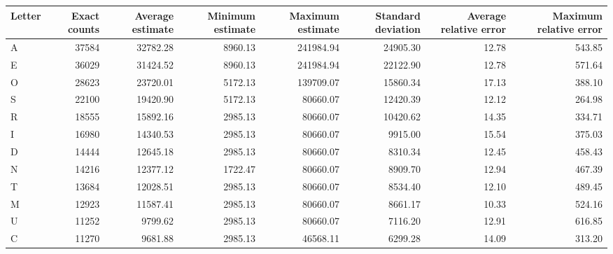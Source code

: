 \begin{tabular}{lrrrrrrr}
\toprule
Letter &  Exact counts &  Average estimate &  Minimum estimate &  Maximum estimate &  Standard deviation &  Average relative error &  Maximum relative error \\
\midrule
     A &         37584 &          32782.28 &           8960.13 &         241984.94 &            24905.30 &                   12.78 &                  543.85 \\
     E &         36029 &          31424.52 &           8960.13 &         241984.94 &            22122.90 &                   12.78 &                  571.64 \\
     O &         28623 &          23720.01 &           5172.13 &         139709.07 &            15860.34 &                   17.13 &                  388.10 \\
     S &         22100 &          19420.90 &           5172.13 &          80660.07 &            12420.39 &                   12.12 &                  264.98 \\
     R &         18555 &          15892.16 &           2985.13 &          80660.07 &            10420.62 &                   14.35 &                  334.71 \\
     I &         16980 &          14340.53 &           2985.13 &          80660.07 &             9915.00 &                   15.54 &                  375.03 \\
     D &         14444 &          12645.18 &           2985.13 &          80660.07 &             8310.34 &                   12.45 &                  458.43 \\
     N &         14216 &          12377.12 &           1722.47 &          80660.07 &             8909.70 &                   12.94 &                  467.39 \\
     T &         13684 &          12028.51 &           2985.13 &          80660.07 &             8534.40 &                   12.10 &                  489.45 \\
     M &         12923 &          11587.41 &           2985.13 &          80660.07 &             8661.17 &                   10.33 &                  524.16 \\
     U &         11252 &           9799.62 &           2985.13 &          80660.07 &             7116.20 &                   12.91 &                  616.85 \\
     C &         11270 &           9681.88 &           2985.13 &          46568.11 &             6299.28 &                   14.09 &                  313.20 \\

\end{tabular}
